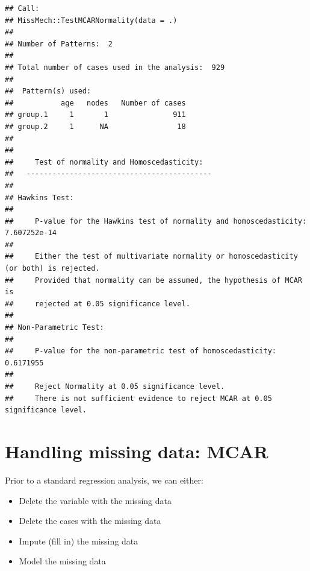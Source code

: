 \documentclass[
  12pt,
  krantz2]{krantz}
\makeatletter
\newenvironment{Shaded}{\begin{snugshade}}{\end{snugshade}}
\newcommand{\KeywordTok}[1]{\textcolor[rgb]{0.13,0.29,0.53}{\textbf{#1}}}
\newcommand{\NormalTok}[1]{#1}
\newcommand{\OperatorTok}[1]{\textcolor[rgb]{0.81,0.36,0.00}{\textbf{#1}}}
\newcommand{\StringTok}[1]{\textcolor[rgb]{0.31,0.60,0.02}{#1}}
\providecommand{\tightlist}{%
  \setlength{\itemsep}{0pt}\setlength{\parskip}{0pt}}
\newenvironment{kframe}{%
\medskip{}
\setlength{\fboxsep}{.8em}
 \def\at@end@of@kframe{}%
 \ifinner\ifhmode%
  \def\at@end@of@kframe{\end{minipage}}%
  \begin{minipage}{\columnwidth}%
 \fi\fi%
 \def\FrameCommand##1{\hskip\@totalleftmargin \hskip-\fboxsep
 \colorbox{shadecolor}{##1}\hskip-\fboxsep
     \hskip-\linewidth \hskip-\@totalleftmargin \hskip\columnwidth}%
 \MakeFramed {\advance\hsize-\width
   \@totalleftmargin\z@ \linewidth\hsize
   \@setminipage}}%
 {\par\unskip\endMakeFramed%
 \at@end@of@kframe}
\renewenvironment{Shaded}{\begin{kframe}}{\end{kframe}}
\makeatother
\begin{document}
\begin{Shaded}
\end{Shaded}

\begin{verbatim}
## Call:
## MissMech::TestMCARNormality(data = .)
## 
## Number of Patterns:  2 
## 
## Total number of cases used in the analysis:  929 
## 
##  Pattern(s) used:
##           age   nodes   Number of cases
## group.1     1       1               911
## group.2     1      NA                18
## 
## 
##     Test of normality and Homoscedasticity:
##   -------------------------------------------
## 
## Hawkins Test:
## 
##     P-value for the Hawkins test of normality and homoscedasticity:  7.607252e-14 
## 
##     Either the test of multivariate normality or homoscedasticity (or both) is rejected.
##     Provided that normality can be assumed, the hypothesis of MCAR is 
##     rejected at 0.05 significance level. 
## 
## Non-Parametric Test:
## 
##     P-value for the non-parametric test of homoscedasticity:  0.6171955 
## 
##     Reject Normality at 0.05 significance level.
##     There is not sufficient evidence to reject MCAR at 0.05 significance level.
\end{verbatim}

\hypertarget{handling-missing-data-mcar}{%
\section{Handling missing data: MCAR}\label{handling-missing-data-mcar}}


Prior to a standard regression analysis, we can either:

\begin{itemize}
\tightlist
\item
  Delete the variable with the missing data
\item
  Delete the cases with the missing data
\item
  Impute (fill in) the missing data
\item
  Model the missing data
\end{itemize}
\end{document}
